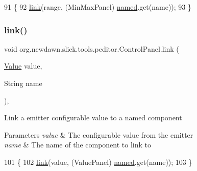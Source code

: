 \begin{DoxyCode}
91                                                   \{
92         \mbox{\hyperlink{classorg_1_1newdawn_1_1slick_1_1tools_1_1peditor_1_1_control_panel_a0cd8f0c59ddca29c48029fcc41c0bbde}{link}}(range, (MinMaxPanel) \mbox{\hyperlink{classorg_1_1newdawn_1_1slick_1_1tools_1_1peditor_1_1_control_panel_a27108a3c115a462302ebfa67d895bcaa}{named}}.get(name));
93     \}
\end{DoxyCode}
\mbox{\label{classorg_1_1newdawn_1_1slick_1_1tools_1_1peditor_1_1_control_panel_a7cd3eff641c2166052877f30525488a5}} 
\subsubsection{\texorpdfstring{link()}{link()}\hspace{0.1cm}{\footnotesize\ttfamily [2/4]}}
{\footnotesize\ttfamily void org.\+newdawn.\+slick.\+tools.\+peditor.\+Control\+Panel.\+link (\begin{DoxyParamCaption}\item[{\mbox{\hyperlink{interfaceorg_1_1newdawn_1_1slick_1_1particles_1_1_configurable_emitter_1_1_value}{Value}}}]{value,  }\item[{String}]{name }\end{DoxyParamCaption})\hspace{0.3cm}{\ttfamily [inline]}, {\ttfamily [protected]}}

Link a emitter configurable value to a named component


\begin{DoxyParams}{Parameters}
{\em value} & The configurable value from the emitter \\
\hline
{\em name} & The name of the component to link to \\
\hline
\end{DoxyParams}

\begin{DoxyCode}
101                                                   \{
102         \mbox{\hyperlink{classorg_1_1newdawn_1_1slick_1_1tools_1_1peditor_1_1_control_panel_a0cd8f0c59ddca29c48029fcc41c0bbde}{link}}(value, (ValuePanel) \mbox{\hyperlink{classorg_1_1newdawn_1_1slick_1_1tools_1_1peditor_1_1_control_panel_a27108a3c115a462302ebfa67d895bcaa}{named}}.get(name));
103     \}
\end{DoxyCode}
\mbox{\label{classorg_1_1newdawn_1_1slick_1_1tools_1_1peditor_1_1_control_panel_af5b325d2af82547dd9b9392c0bfe8a15}} 
